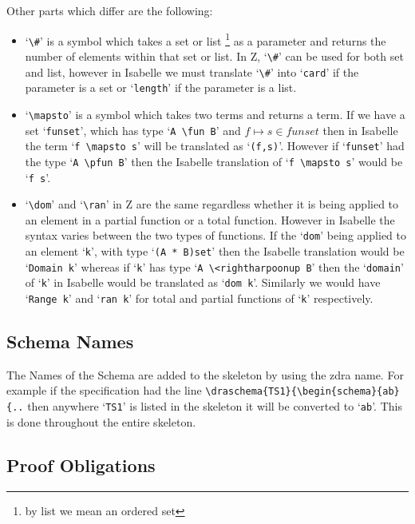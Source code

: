 Other parts which differ are the following:

\begin{itemize}
\item `\verb|\#|' is a symbol which takes a set or list \footnote{by list we
mean an ordered set} as a parameter and returns the number of elements within
that set or list. In Z, `\verb|\#|' can be used for both set and list, however
in Isabelle we must translate `\verb|\#|' into `\verb|card|' if the parameter is
a set or `\verb|length|' if the parameter is a list.

\item `\verb|\mapsto|' is a symbol which takes two terms and returns a term. If
we have a set `\verb|funset|', which has type `\verb|A \fun B|' and $f \mapsto s
\in funset$ then in Isabelle the term `\verb|f \mapsto s|' will be translated as
`\verb|(f,s)|'. However if `\verb|funset|' had the type `\verb|A \pfun B|' then
the Isabelle translation of `\verb|f \mapsto s|' would be `\verb|f s|'.

\item `\verb|\dom|' and `\verb|\ran|' in Z are the same regardless whether it is
being applied to an element in a partial function or a total function. However
in Isabelle the syntax varies between the two types of functions. If the
`\verb|dom|' being applied to an element `\verb|k|', with type
`\verb|(A * B)set|' then the Isabelle translation would be `\verb|Domain k|' whereas if
`\verb|k|' has type `\verb|A \<rightharpoonup B|' then the `\verb|domain|' of
`\verb|k|' in Isabelle would be translated as `\verb|dom k|'. Similarly we would
have `\verb|Range k|' and `\verb|ran k|' for total and partial functions of
`\verb|k|' respectively.
\end{itemize}

\subsection{Schema Names}

The Names of the Schema are added to the skeleton by using the \gls{zdra} name.
For example if the specification had the line
\verb|\draschema{TS1}{\begin{schema}{ab}{..| then anywhere `\texttt{TS1}' is
listed in the skeleton it will be converted to `\texttt{ab}'. This is done
throughout the entire skeleton.

\subsection{Proof Obligations}

